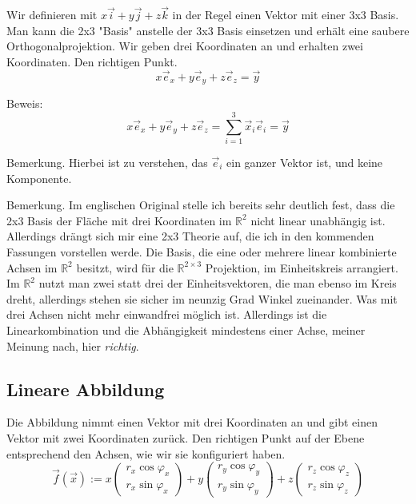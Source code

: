 \documentclass[a4paper]{article}
\begin{document}
Wir definieren mit $x\vec{i}+y\vec{j}+z\vec{k}$ in der Regel einen Vektor mit einer 3x3 Basis. Man kann die 2x3 "Basis" anstelle der 3x3 Basis einsetzen und erh\"alt eine saubere Orthogonalprojektion. Wir geben drei Koordinaten an und erhalten zwei Koordinaten. Den richtigen Punkt.\\

\begin{displaymath}
x\vec{e}_{x} + y\vec{e}_{y} + z\vec{e}_{z} = \vec{y} 
\end{displaymath}

Beweis:\\

\begin{displaymath}
x\vec{e}_{x} + y\vec{e}_{y} + z\vec{e}_{z} = \sum_{i=1}^{3}\vec{x}_{i}\vec{e}_{i} = \vec{y} 
\end{displaymath}

Bemerkung. Hierbei ist zu verstehen, das $\vec{e}_{i}$ ein ganzer Vektor ist, und keine Komponente.

Bemerkung. Im englischen Original stelle ich bereits sehr deutlich fest, dass die 2x3 Basis der Fl\"ache mit drei Koordinaten im $\mathbb{R}^{2}$ nicht linear unabh\"angig ist. Allerdings dr\"angt sich mir eine 2x3 Theorie auf, die ich in den kommenden Fassungen vorstellen werde. Die Basis, die eine oder mehrere linear kombinierte Achsen im $\mathbb{R}^{2}$ besitzt, wird f\"ur die $\mathbb{R}^{2\times3}$ Projektion, im Einheitskreis arrangiert. Im $\mathbb{R}^{2}$ nutzt man zwei statt drei der Einheitsvektoren, die man ebenso im Kreis dreht, allerdings stehen sie sicher im neunzig Grad Winkel zueinander. Was mit drei Achsen nicht mehr einwandfrei m\"oglich ist. Allerdings ist die Linearkombination und die Abh\"angigkeit mindestens einer Achse, meiner Meinung nach, hier \emph{richtig}.


\subsection{Lineare Abbildung}

Die Abbildung nimmt einen Vektor mit drei Koordinaten an und gibt einen Vektor mit zwei Koordinaten zur\"uck. 
Den richtigen Punkt auf der Ebene entsprechend den Achsen, wie wir sie konfiguriert haben.\\

\begin{displaymath}
\vec{f}(\vec{x}) := x \begin{pmatrix}r_x \cos \varphi_x\\r_x \sin \varphi_x\end{pmatrix} +y  \begin{pmatrix}r_y \cos \varphi_y\\r_y \sin \varphi_y\end{pmatrix} +z  \begin{pmatrix}r_z \cos \varphi_z\\r_z \sin \varphi_z\end{pmatrix}
\end{displaymath}
\end{document}
